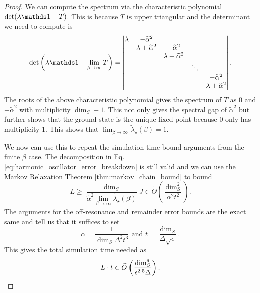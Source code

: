 \begin{proof}
We can compute the spectrum via the characteristic polynomial $\det(\lambda \identity - T)$. This is because $T$ is upper triangular and the determinant we need to compute is
\begin{equation}
    \det \left(\lambda \identity - \lim_{\beta \to \infty} T \right) =  \begin{vmatrix}
        \lambda & -\widetilde{\alpha}^2 &   &\\
        & \lambda + \widetilde{\alpha}^2 & -\widetilde{\alpha}^2 &  &\\
        & & \lambda + \widetilde{\alpha}^2  & & \\
        & & & \ddots & \\
        & &     &       & -\widetilde{\alpha}^2 \\
        & &  & & \lambda + \widetilde{\alpha}^2
    \end{vmatrix}.
\end{equation}
    The roots of the above characteristic polynomial gives the spectrum of $T$ as 0 and $-\widetilde{\alpha}^2$ with multiplicity $\dim_S - 1$. This not only gives the spectral gap of $\widetilde{\alpha}^2$ but further shows that the ground state is the unique fixed point because 0 only has multiplicity 1. This shows that $\lim_{\beta \to \infty} \widetilde{\lambda}_\star(\beta) = 1$.

    We now can use this to repeat the simulation time bound arguments from the finite $\beta$ case. The decomposition in Eq. \eqref{eq:harmonic_oscillator_error_breakdown} is still valid and we can use the Markov Relaxation Theorem \ref{thm:markov_chain_bound} to bound
    \begin{equation}
        L \ge \frac{\dim_S}{\widetilde{\alpha}^2\lim_{\beta \to \infty} \widetilde{\lambda}_\star(\beta)} J \in \widetilde{\Theta}\left({\frac{\dim_S^2}{\alpha^2 t^2}}\right).
    \end{equation}
    The arguments for the off-resonance and remainder error bounds are the exact same and tell us that it suffices to set
    \begin{equation}
        \alpha = \frac{1}{\dim_S \Delta^2 t^3} \text{ and } t = \frac{\dim_S}{\Delta \sqrt{\epsilon}}.
    \end{equation}
    This gives the total simulation time needed as
    \begin{equation}
        L\cdot t \in \widetilde{O} \left( \frac{\dim_S^9}{\epsilon^{2.5} \Delta} \right).
    \end{equation}
\end{proof}



